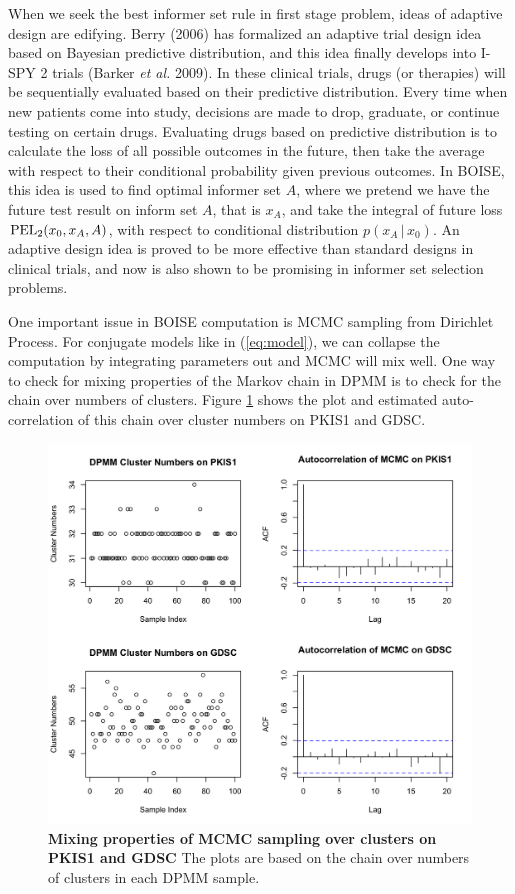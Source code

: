 \documentclass[12pt]{article}
\begin{document}
When we seek the best informer set rule in first stage problem, ideas of adaptive design are edifying. Berry (2006) has formalized an adaptive trial design idea based on Bayesian predictive distribution, and this idea finally develops into I-SPY 2 trials (Barker {\em et al.} 2009). In these clinical trials, drugs (or therapies) will be sequentially evaluated based on their predictive distribution. Every time when new patients come into study, decisions are made to drop, graduate, or continue testing on certain drugs. Evaluating drugs based on predictive distribution is to calculate the loss of all possible outcomes in the future, then take the average with respect to their conditional probability given previous outcomes. In BOISE, this idea is used to find optimal informer set $A$, where we pretend we have the future test result on inform set $A$, that is $x_A$, and take the integral of future loss ${\rm PEL}_2(x_0,x_A,A)$, with respect to conditional distribution $p(x_A\,|\,x_0)$. An adaptive design idea is proved to be more effective than standard designs in clinical trials, and now is also shown to be promising in informer set selection problems. 

One important issue in BOISE computation is MCMC sampling from Dirichlet Process. For conjugate models like in (\ref{eq:model}), we can collapse the computation by integrating parameters out and MCMC will mix well. One way to check for mixing properties of the Markov chain in DPMM is to check for the chain over numbers of clusters. Figure \ref{fig:mcmc} shows the plot and estimated auto-correlation of this chain over cluster numbers on PKIS1 and GDSC. 

\begin{figure}[!ht]
\centering
\includegraphics[width=5.0in]{DPMM_performance.png}
\caption{\label{fig:mcmc} 
{\bf Mixing properties of MCMC sampling over clusters on PKIS1 and GDSC} The plots are based on the chain over numbers of clusters in each DPMM sample.}
\end{figure}
\end{document}
